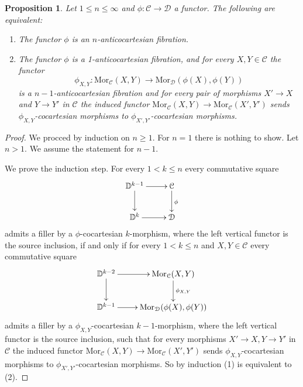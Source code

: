 \documentclass[10pt,oneside]{article}
\numberwithin{equation}{section} %
\numberwithin{figure}{section} %
\theoremstyle{plain}
\newtheorem{proposition}[theorem]{Proposition}
\theoremstyle{definition}
\newcommand{\bD}{{\mathbb D}}
\newcommand{\mC}{{\mathcal C}}
\newcommand{\mD}{{\mathcal D}}
\newcommand{\X}{X}
\newcommand{\Y}{Y}
\newcommand{\Mor}{{\mathrm{Mor}}}
\begin{document}
\begin{proposition}\label{cocarto}
Let $1 \leq n \leq \infty$ and $\phi: \mC \to \mD$ a functor.
The following are equivalent:

\begin{enumerate}[\normalfont(1)]\setlength{\itemsep}{-2pt}
\item The functor $\phi$ is an $n$-anticocartesian fibration.

\item The functor $\phi$ is a 1-anticocartesian fibration, and for every $\X,\Y \in \mC$ the functor
\[
\phi_{X,Y}: \Mor_\mC(\X,\Y) \to \Mor_\mD(\phi(\X),\phi(\Y))
\]
is a $n-1$-anticocartesian fibration
and for every pair of morphisms $X' \to X$ and $Y \to Y'$ in $\mC$
the induced functor 
$\Mor_\mC(\X,\Y) \to \Mor_\mC(X',Y')$ sends $\phi_{X,Y}$-cocartesian morphisms to $\phi_{X',Y'}$-cocartesian morphisms.
\end{enumerate}

\end{proposition}

\begin{proof}

We procced by induction on $n \geq 1.$ For $n=1$ there is nothing to show. Let $n > 1.$ We assume the statement for $n-1$.

We prove the induction step. For every $1 < k \leq n$ every commutative square 
\begin{equation}\label{filler3}
\begin{xy}
\xymatrix{
\bD^{k-1} \ar[d] \ar[r]
& \mC \ar[d]^\phi
\\ 
\bD^k \ar[r] & \mD
}
\end{xy}\end{equation}
admits a filler by a $\phi$-cocartesian $k$-morphism,
where the left vertical functor is the source inclusion,
if and only if for every $1 < k \leq n$ and $X,Y \in \mC$ every commutative square 
\begin{equation}
\begin{xy}
\xymatrix{
\bD^{k-2} \ar[d] \ar[r]
& \Mor_\mC(X,Y) \ar[d]^{\phi_{X,Y}}
\\ 
\bD^{k-1} \ar[r] & \Mor_\mD(\phi(X),\phi(Y))
}
\end{xy}\end{equation}
admits a filler by a $\phi_{X,Y}$-cocartesian $k-1$-morphism,
where the left vertical functor is the source inclusion,
such that for every morphisms $X' \to X, Y \to Y'$ in $\mC$
the induced functor 
$\Mor_\mC(\X,\Y) \to \Mor_\mC(X',Y')$ sends $\phi_{X,Y}$-cocartesian morphisms to $\phi_{X',Y'}$-cocartesian morphisms.
So by induction (1) is equivalent to (2).
\end{proof}
\end{document}
